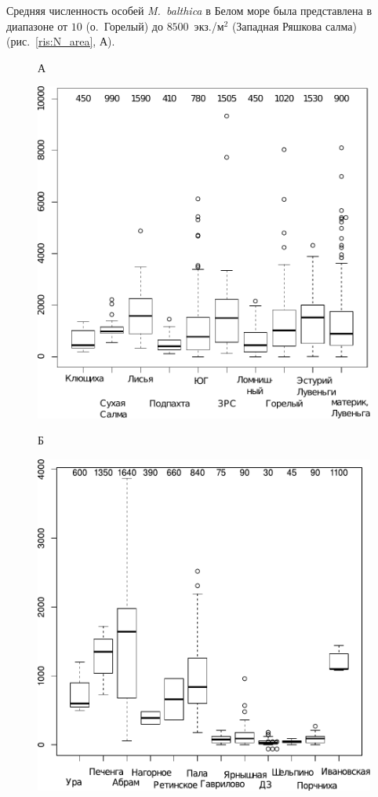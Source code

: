 {{Средняя численность особей {\it M.~balthica} в Белом море была представлена в диапазоне от $10$ (о.~Горелый) до $8500$~экз./м$^2$ (Западная Ряшкова салма)(рис.~\ref{ris:N_area}, А).
	\begin{figure}[ht]
	\begin{minipage}[]{.48\linewidth}
	{\small А}
	\begin{center}
		\includegraphics[width=\linewidth]{../All_N/N2_area_White1.pdf}
	\end{center}
	\end{minipage}
	\hfill
	\begin{minipage}[]{.48\linewidth}
	{\small Б}
	\begin{center}
		\includegraphics[width=\linewidth]{../All_N/N2_area_Barents1.pdf}

\end{center}
\end{minipage}
\end{figure}}}
